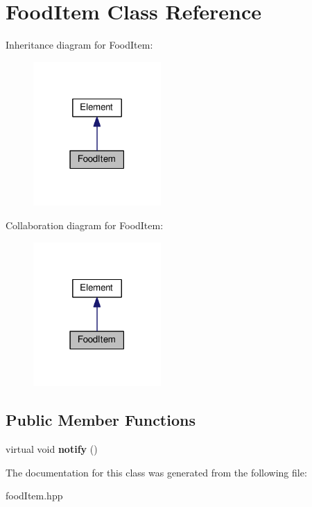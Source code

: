 \hypertarget{classFoodItem}{}\section{Food\+Item Class Reference}
\label{classFoodItem}


Inheritance diagram for Food\+Item\+:
\nopagebreak
\begin{figure}[H]
\begin{center}
\leavevmode
\includegraphics[width=138pt]{classFoodItem__inherit__graph}
\end{center}
\end{figure}


Collaboration diagram for Food\+Item\+:
\nopagebreak
\begin{figure}[H]
\begin{center}
\leavevmode
\includegraphics[width=138pt]{classFoodItem__coll__graph}
\end{center}
\end{figure}
\subsection*{Public Member Functions}
\begin{DoxyCompactItemize}
\item 
virtual void {\bfseries notify} ()\hypertarget{classFoodItem_ad7c00abb43b23475db4e60c87f98eb86}{}\label{classFoodItem_ad7c00abb43b23475db4e60c87f98eb86}

\end{DoxyCompactItemize}


The documentation for this class was generated from the following file\+:\begin{DoxyCompactItemize}
\item 
food\+Item.\+hpp\end{DoxyCompactItemize}
